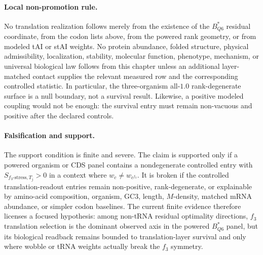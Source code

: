 \paragraph{Local non-promotion rule.}
No translation realization follows merely from the existence of the $B^{\ast}_{Q6}$ residual coordinate, from the codon lists above, from the powered rank geometry, or from modeled tAI or stAI weights. No protein abundance, folded structure, physical admissibility, localization, stability, molecular function, phenotype, mechanism, or universal biological law follows from this chapter unless an additional layer-matched contact supplies the relevant measured row and the corresponding controlled statistic. In particular, the three-organism all-$1.0$ rank-degenerate surface is a null boundary, not a survival result. Likewise, a positive modeled coupling would not be enough: the survival entry must remain non-vacuous and positive after the declared controls.

\paragraph{Falsification and support.}
The support condition is finite and severe. The claim is supported only if a powered organism or CDS panel contains a nondegenerate controlled entry with $S_{f_3\text{-stress},T_j}>0$ in a context where $w_c\neq w_{c^{f_3}}$. It is broken if the controlled translation-readout entries remain non-positive, rank-degenerate, or explainable by amino-acid composition, organism, GC3, length, $M$-density, matched mRNA abundance, or simpler codon baselines. The current finite evidence therefore licenses a focused hypothesis: among non-tRNA residual optimality directions, $f_3$ translation selection is the dominant observed axis in the powered $B^{\ast}_{Q6}$ panel, but its biological readback remains bounded to translation-layer survival and only where wobble or tRNA weights actually break the $f_3$ symmetry.